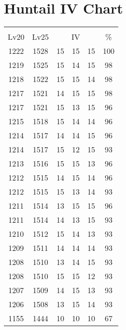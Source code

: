 \documentclass{article}%
\begin{document}
%
\normalsize%
\section{Huntail IV Chart}%
\label{sec:Huntail IV Chart}%
\renewcommand{\arraystretch}{1.5}%
\begin{tabular}{|c|c|c|c|c|c|}%
\hline%
\multicolumn{6}{|c|}{\textcolor{white}{ 
\linebreak{Huntail}
}%
\cellcolor{black}}\\%
\multicolumn{1}{|c}{Lv20}&\multicolumn{1}{c|}{Lv25}&\multicolumn{3}{c|}{IV}&\multicolumn{1}{|c|}{\%}\\%
\hline%
\rowcolor{color100}%
1222&1528&15&15&15&100\\%
\hline%
\rowcolor{color98}%
1219&1525&15&14&15&98\\%
\hline%
\rowcolor{color98}%
1218&1522&15&15&14&98\\%
\hline%
\rowcolor{color98}%
1217&1521&14&15&15&98\\%
\hline%
\rowcolor{color96}%
1217&1521&15&13&15&96\\%
\hline%
\rowcolor{color96}%
1215&1518&15&14&14&96\\%
\hline%
\rowcolor{color96}%
1214&1517&14&14&15&96\\%
\hline%
\rowcolor{color93}%
1214&1517&15&12&15&93\\%
\hline%
\rowcolor{color96}%
1213&1516&15&15&13&96\\%
\hline%
\rowcolor{color96}%
1212&1515&14&15&14&96\\%
\hline%
\rowcolor{color93}%
1212&1515&15&13&14&93\\%
\hline%
\rowcolor{color96}%
1211&1514&13&15&15&96\\%
\hline%
\rowcolor{color93}%
1211&1514&14&13&15&93\\%
\hline%
\rowcolor{color93}%
1210&1512&15&14&13&93\\%
\hline%
\rowcolor{color93}%
1209&1511&14&14&14&93\\%
\hline%
\rowcolor{color93}%
1208&1510&13&14&15&93\\%
\hline%
\rowcolor{color93}%
1208&1510&15&15&12&93\\%
\hline%
\rowcolor{color93}%
1207&1509&14&15&13&93\\%
\hline%
\rowcolor{color93}%
1206&1508&13&15&14&93\\%
\hline%
\rowcolor{color91}%
1155&1444&10&10&10&67\\%
\end{tabular}

%
\end{document}
